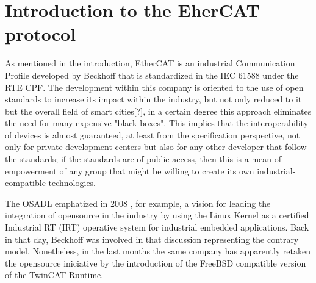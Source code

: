 \chapter{Introduction to the EherCAT protocol}\label{sec:ecat_protocol}

As mentioned in the introduction, EtherCAT is an industrial Communication Profile developed by Beckhoff that is 
standardized in the IEC 61588 under the RTE CPF. The development within this company is oriented to the use of 
open standards to increase its impact within the industry, but not only reduced to it but the overall field of smart cities[?], in
a certain degree this approach eliminates the need for many expensive "black boxes"\cite{beckhoff_automation}. %
This implies that the interoperability of devices is almost guaranteed, at least from the specification perspective,
not only for private development centers but also for any other developer that follow the standards; if the standards 
are of public access, then this is a mean of empowerment of any group that might be willing
to create its own industrial-compatible technologies.

The OSADL emphatized in 2008 \cite{beckhoff_vs_osadl}, for example, a vision for leading the integration
of opensource in the industry by using the Linux Kernel as a certified Industrial RT (IRT) operative system for industrial embedded applications. 
Back in that day, Beckhoff was involved in that discussion representing the contrary model. Nonetheless, in the last months the same company has
apparently retaken the opensource iniciative by the introduction of the FreeBSD compatible version of the TwinCAT Runtime\cite{beckhoff_freebsd}.%

